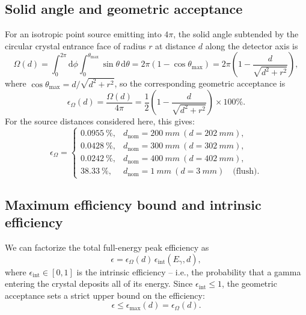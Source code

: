 \documentclass[11pt,a4paper]{article}
\begin{document}
\subsection{Solid angle and geometric acceptance}
For an isotropic point source emitting into $4\pi$, the solid angle subtended by the circular crystal entrance face of radius $r$ at distance $d$ along the detector axis is
\begin{equation}
  \Omega(d) = \int_{0}^{2\pi} \mathrm{d}\phi \int_{0}^{\theta_{\max}} \sin\theta\,\mathrm{d}\theta = 2\pi(1 - \cos\theta_{\max}) = 2\pi\left(1-\frac{d}{\sqrt{d^2+r^2}}\right),
  \label{eq:solid-angle}
\end{equation}
where $\cos\theta_{\max} = d/\sqrt{d^2+r^2}$, so the corresponding geometric acceptance is
\begin{equation}
  \epsilon_\Omega(d)=\frac{\Omega(d)}{4\pi}
  =\frac{1}{2}\left(1-\frac{d}{\sqrt{d^2+r^2}}\right)\times100\%.
  \label{eq:omega}
\end{equation}
For the source distances considered here, this gives:
\begin{equation}
  \epsilon_\Omega =
  \begin{cases}
    \SI{0.0955}{\percent}, & d_{\mathrm{nom}} = \SI{200}{mm} \ (d=\SI{202}{mm}),\\
    \SI{0.0428}{\percent}, & d_{\mathrm{nom}} = \SI{300}{mm} \ (d=\SI{302}{mm}),\\
    \SI{0.0242}{\percent}, & d_{\mathrm{nom}} = \SI{400}{mm} \ (d=\SI{402}{mm}),\\
    \SI{38.33}{\percent}, & d_{\mathrm{nom}} = \SI{1}{mm} \ (d=\SI{3}{mm})\quad\text{(flush)}.
  \end{cases}
  \label{eq:omega-values}
\end{equation}

\subsection{Maximum efficiency bound and intrinsic efficiency}
We can factorize the total full-energy peak efficiency as
\begin{equation}
  \epsilon=\epsilon_\Omega(d)\,\epsilon_{\mathrm{int}}(E_\gamma,d),
  \label{eq:factorization}
\end{equation}
where $\epsilon_{\mathrm{int}}\in[0,1]$ is the intrinsic efficiency -- i.e., the probability that a gamma entering the crystal deposits all of its energy. Since $\epsilon_{\mathrm{int}}\le1$, the geometric acceptance sets a strict upper bound on the efficiency:
\begin{equation}
  \epsilon\le\epsilon_{\max}(d)=\epsilon_\Omega(d).
  \label{eq:eff-max}
\end{equation}
\end{document}
